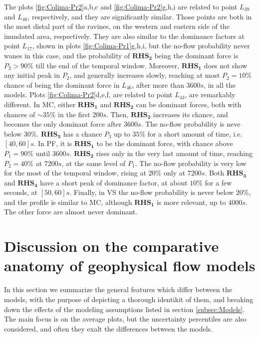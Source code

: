 \documentclass{article}
\begin{document}
The plots \ref{fig:Colima-Pr2}a,b,c and \ref{fig:Colima-Pr2}g,h,i are related to point $L_{39}$ and $L_{46}$, respectively, and they are significantly similar. Those points are both in the most distal part of the ravines, on the western and eastern side of the inundated area, respectively. They are also similar to the dominance factors at point $L_{17}$, shown in plots \ref{fig:Colima-Pr1}g,h,i, but the no-flow probability never wanes in this case, and the probability of $\boldsymbol{RHS_2}$ being the dominant force is $P_2>90\%$ till the end of the temporal window. Moreover, $\boldsymbol{RHS_1}$ does not show any initial peak in $P_2$, and generally increases slowly, reaching at most $P_2=10\%$ chance of being the dominant force in $L_{46}$, after more than $3600 s$, in all the models. Plots \ref{fig:Colima-Pr2}d,e,f, are related to point $L_{43}$, are remarkably different. In MC, either $\boldsymbol{RHS_1}$ and $\boldsymbol{RHS_2}$ can be dominant forces, both with chances of $\sim 35\%$ in the first $200 s$. Then, $\boldsymbol{RHS_2}$ increases its chance, and becomes the only dominant force after $3600 s$. The no-flow probability is neve below $30\%$. $\boldsymbol{RHS_3}$ has a chance $P_3$ up to $35\%$ for a short amount of time, i.e. $[40, 60] s$. In PF, it is $\boldsymbol{RHS_1}$ to be the dominant force, with chance above $P_1=90\%$ until $3600 s$. $\boldsymbol{RHS_2}$ rises only in the very last amount of time, reaching $P_2=40\%$ at $7200 s$, at the same level of $P_1$. The no-flow probability is very low for the most of the temporal window, rising at $20\%$ only at $7200 s$. Both $\boldsymbol{RHS_3}$ and $\boldsymbol{RHS_4}$ have a short peak of dominance factor, at about $10\%$ for a few seconds, at $[50,60] s$. Finally, in VS the no-flow probability is never below $20\%$, and the profile is similar to MC, although $\boldsymbol{RHS_1}$ is more relevant, up to $4000 s$. The other force are almost never dominant.


\section{Discussion on the comparative anatomy of geophysical flow models}
In this section we summarize the general features which differ between the models, with the purpose of depicting a thorough identikit of them, and breaking down the effects of the modeling assumptions listed in section \ref{subsec:Models}. The main focus is on the average plots, but the uncertainty percentiles are also considered, and often they exalt the differences between the models.
\end{document}
